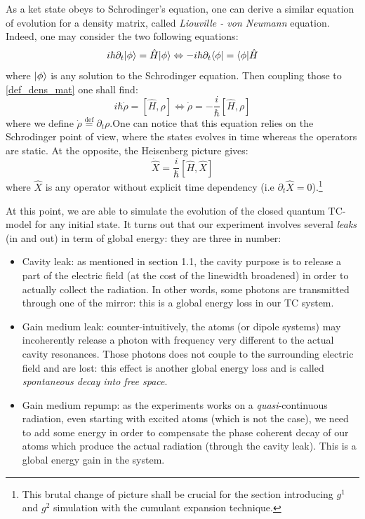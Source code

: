 \documentclass[11pt]{report}
\DeclarePairedDelimiter\bra{\langle}{\rvert}
\DeclarePairedDelimiter\ket{\lvert}{\rangle}
\begin{document}
As a ket state obeys to Schrodinger's equation, one can derive a similar equation of evolution for a density matrix, called \textit{Liouville - von Neumann} equation. Indeed, one may consider the two following equations:
\begin{equation}
i\hbar\partial _t\ket{\phi} = \hat{H}\ket{\phi} \Leftrightarrow -i\hbar\partial _t\bra{\phi} = \bra{\phi}\hat{H}
\end{equation}
where $\ket{\phi}$ is any solution to the Schrodinger equation. Then coupling those to \eqref{def_dens_mat} one shall find:
\begin{equation}
\label{vonneuman}
i\hbar\dot{\rho} = \left[ \hat{H}, \rho \right] \Leftrightarrow \dot{\rho} = -\frac{i}{\hbar} \left[ \hat{H}, \rho \right]
\end{equation}
where we define $\dot{\rho} \stackrel{\text{def}}{=} \partial _t \rho$.One can notice that this equation relies on the Schrodinger point of view, where the states evolves in time whereas the operators are static. At the opposite, the Heisenberg picture gives:
\begin{equation}
\dot{\hat{X}} = \frac{i}{\hbar} \left[ \hat{H}, \hat{X} \right]
\end{equation}
where $\hat{X}$ is any operator without explicit time dependency (i.e $\partial _t \hat{X} = 0$).\footnote{This brutal change of picture shall be crucial for the section introducing $g^1$ and $g^2$ simulation with the cumulant expansion technique.}

At this point, we are able to simulate the evolution of the closed quantum TC-model for any initial state. It turns out that our experiment involves several \textit{leaks} (in and out) in term of global energy: they are three in number:
\begin{itemize}
	\item Cavity leak: as mentioned in section 1.1, the cavity purpose is to release a part of the electric field (at the cost of the linewidth broadened) in order to actually collect the radiation. In other words, some photons are transmitted through one of the mirror: this is a global energy loss in our TC system.
	\item Gain medium leak: counter-intuitively, the atoms (or dipole systems) may incoherently release a photon with frequency very different to the actual cavity resonances. Those photons does not couple to the surrounding electric field and are lost: this effect is another global energy loss and is called \textit{spontaneous decay into free space}.
	\item Gain medium repump: as the experiments works on a \textit{quasi}-continuous radiation, even starting with excited atoms (which is not the case), we need to add some energy in order to compensate the phase coherent decay of our atoms which produce the actual radiation (through the cavity leak). This is a global energy gain in the system.
\end{itemize}
\end{document}
